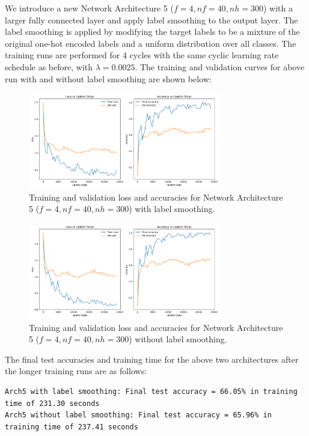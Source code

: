 \documentclass[11pt]{article}
\begin{document}
We introduce a new Network Architecture 5 ($f=4, nf=40, nh=300$) with a larger fully connected layer and apply label smoothing to the output layer. The label smoothing is applied by modifying the target labels to be a mixture of the original one-hot encoded labels and a uniform distribution over all classes. The training runs are performed for 4 cycles with the same cyclic learning rate schedule as before, with $\lambda = 0.0025$. 
The training and validation curves for above run with and without label smoothing are shown below:
\begin{figure}[H]
  \centering
  \includegraphics[width=0.75\textwidth]{results/architecture_ConvNet_smoothing_training_plot.png}
  \caption{Training and validation loss and accuracies for Network Architecture 5 ($f=4, nf=40, nh=300$) with label smoothing.}
  \label{fig:label_smoothing_arch5}
\end{figure}

\begin{figure}[H]
  \centering
  \includegraphics[width=0.75\textwidth]{results/architecture_ConvNet_no_smoothing_training_plot.png}
  \caption{Training and validation loss and accuracies for Network Architecture 5 ($f=4, nf=40, nh=300$) without label smoothing.}
  \label{fig:no_label_smoothing_arch5}
\end{figure}


The final test accuracies and training time for the above two architectures after the longer training runs are as follows:
\begin{lstlisting}[caption={Final test accuracies and training time of Arch5 with and without label smoothing}, label={lst:label_smoothing_accuracies}]
Arch5 with label smoothing: Final test accuracy = 66.05% in training time of 231.30 seconds
Arch5 without label smoothing: Final test accuracy = 65.96% in training time of 237.41 seconds
\end{lstlisting}
\end{document}
